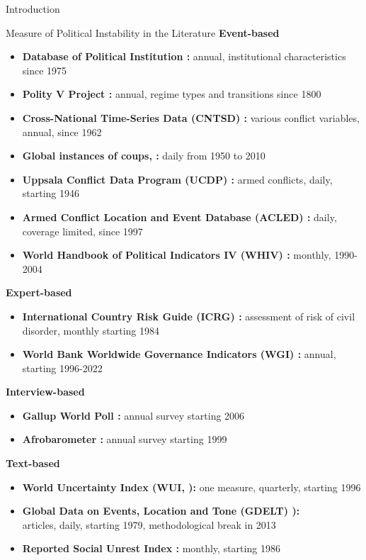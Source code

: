 \documentclass[aspectratio=169,10pt]{beamer}
\begin{document}
\begin{section}[Introduction]{Introduction}
\begin{frame}{Measure of Political Instability in the Literature}
\scriptsize
\textbf{Event-based}
\begin{itemize}
        \item \textbf{Database of Political Institution \citep{Beck2001}:} annual, institutional characteristics since 1975
        \item \textbf{Polity V Project \citep{Marshall2002}:}  annual, regime types and transitions since 1800
         \item \textbf{Cross-National Time-Series Data (CNTSD) \citep{BANKS1979}:}  various conflict variables, annual, since 1962
        \item \textbf{Global instances of coups, \citep{POWELL2011}:}  daily from 1950 to 2010
        \item \textbf{Uppsala Conflict Data Program (UCDP) \citep{sundberg2012}:} armed conflicts, daily, starting 1946
        \item \textbf{Armed Conflict Location and Event Database (ACLED) \citep{RALEIGH2010}:} daily, coverage limited, since 1997
        \item \textbf{World Handbook of Political Indicators IV (WHIV) \citep{jenkins2012}:} monthly, 1990-2004
        \end{itemize}
\textbf{Expert-based}
\begin{itemize}
        \item \textbf{International Country Risk Guide (ICRG) \citep{howell2011}:}  assessment of risk of civil disorder, monthly starting 1984
        \item \textbf{World Bank Worldwide Governance Indicators (WGI) \citep{kaufmann2011}:} annual, starting 1996-2022
        \end{itemize}
\textbf{Interview-based}
\begin{itemize}
         \item \textbf{Gallup World Poll \citep{tortora2010}:} annual survey starting 2006
         \item \textbf{Afrobarometer \citep{mattes2008}:} annual survey starting 1999
\end{itemize}
\textbf{Text-based}
\begin{itemize}
        \item \textbf{World Uncertainty Index (WUI, \citep{AHIR2022}):} one measure, quarterly, starting 1996
        \item \textbf{Global Data on Events, Location and Tone (GDELT) \citep{LEETARU2013}):}\\ articles, daily, starting 1979, methodological break in 2013
    \item \textbf{Reported Social Unrest Index \citep{BARRETT2022}:} monthly, starting 1986
\end{itemize}

\end{frame}


\end{section}
\end{document}
